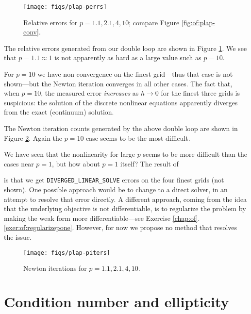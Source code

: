 \begin{figure}
\texttt{[image: figs/plap-perrs]}
\caption{Relative errors for $p=1.1,2.1,4,10$; compare Figure \ref{fig:of:plap-conv}.}
\label{fig:of:plap-perrs}
\end{figure}

The relative errors generated from our double loop are shown in Figure \ref{fig:of:plap-perrs}.  We see that $p = 1.1 \approx 1$ is not apparently as hard as a large value such as $p=10$.

For $p=10$ we have non-convergence on the finest grid---thus that case is not shown---but the Newton iteration converges in all other cases.  The fact that, when $p=10$, the measured error \emph{increases} as $h\to 0$ for the finest three grids is suspicious: the solution of the discrete nonlinear equations apparently diverges from the exact (continuum) solution.

The Newton iteration counts generated by the above double loop are shown in Figure \ref{fig:of:plap-piters}.  Again the $p=10$ case seems to be the most difficult.

We have seen that the nonlinearity for large $p$ seems to be more difficult than the cases near $p=1$, but how about $p=1$ itself?  The result of
is that we get \texttt{DIVERGED\_LINEAR\_SOLVE} errors on the four finest grids (not shown).  One possible approach would be to change to a direct solver, in an attempt to resolve that error directly.  A different approach, coming from the idea that the underlying objective is not differentiable, is to regularize the problem by making the weak form more differentiable---see Exercise \ref{chap:of}.\ref{exer:of:regularizepone}.  However, for now we propose no method that resolves the issue.
\label{page:of:casepone}

\begin{figure}
\texttt{[image: figs/plap-piters]}
\caption{Newton iterations for $p=1.1,2.1,4,10$.}
\label{fig:of:plap-piters}
\end{figure}


\section{Condition number and ellipticity}  \label{page:of:condellip}

